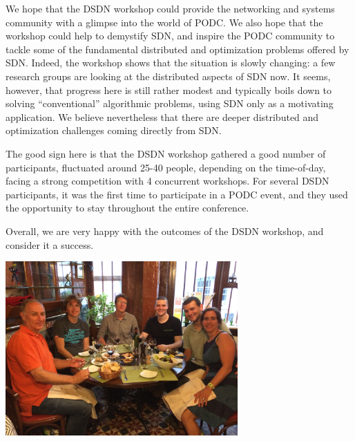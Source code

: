 \documentclass[11pt,pdftex,letter]{article}
\begin{document}
We hope that the DSDN workshop could
provide the networking and systems community with a glimpse into the
world of PODC. We also hope that the workshop could help to demystify
SDN, and inspire the PODC community
to tackle some of the fundamental distributed and
optimization problems offered by SDN.
Indeed, the workshop shows that the situation is slowly changing: a few
research groups are looking at the distributed aspects of SDN now.
It seems, however, that progress here is still rather modest and
typically boils down to solving ``conventional'' algorithmic problems,
using SDN only as a motivating application. We believe nevertheless that
there are deeper distributed and optimization challenges coming directly from SDN.

The good sign here is that the DSDN workshop gathered a good number of participants,
fluctuated around 25-40 people, depending on the time-of-day, facing
a strong competition with 4 concurrent workshops.
For several DSDN participants, it was the first time
to participate in a PODC event, and they used the opportunity
to stay throughout the entire conference.

Overall, we are very happy with the outcomes of the DSDN workshop, and consider it
a success.


\begin{center}
\includegraphics[width=3.5in]{dinner.jpg}
\end{center}


\end{document}
